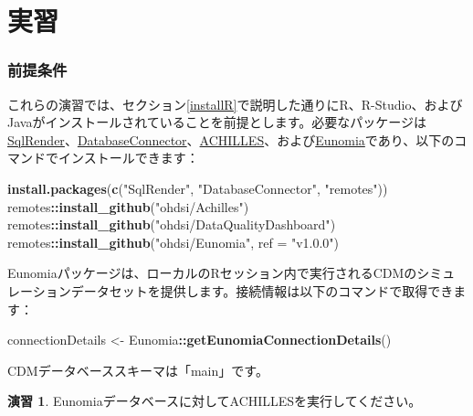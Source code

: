 \documentclass[
  11pt]{book}
\newenvironment{Shaded}{\begin{snugshade}}{\end{snugshade}}
\newcommand{\AttributeTok}[1]{\textcolor[rgb]{0.13,0.29,0.53}{#1}}
\newcommand{\FunctionTok}[1]{\textcolor[rgb]{0.13,0.29,0.53}{\textbf{#1}}}
\newcommand{\NormalTok}[1]{#1}
\newcommand{\OtherTok}[1]{\textcolor[rgb]{0.56,0.35,0.01}{#1}}
\newcommand{\SpecialCharTok}[1]{\textcolor[rgb]{0.81,0.36,0.00}{\textbf{#1}}}
\newcommand{\StringTok}[1]{\textcolor[rgb]{0.31,0.60,0.02}{#1}}
\theoremstyle{definition}
\theoremstyle{definition}
\theoremstyle{definition}
\newtheorem{exercise}{演習}[chapter]
\theoremstyle{definition}
\theoremstyle{remark}
\begin{document}
\section{実習}\label{ux5b9fux7fd2}

\subsubsection*{前提条件}\label{ux524dux63d0ux6761ux4ef6-9}

これらの演習では、セクション\ref{installR}で説明した通りにR、R-Studio、およびJavaがインストールされていることを前提とします。必要なパッケージは\href{https://ohdsi.github.io/SqlRender/}{SqlRender}、\href{https://ohdsi.github.io/DatabaseConnector/}{DatabaseConnector}、\href{https://github.com/OHDSI/Achilles}{ACHILLES}、および\href{https://ohdsi.github.io/Eunomia/}{Eunomia}であり、以下のコマンドでインストールできます：

\begin{Shaded}
\begin{Highlighting}[]
\FunctionTok{install.packages}\NormalTok{(}\FunctionTok{c}\NormalTok{(}\StringTok{"SqlRender"}\NormalTok{, }\StringTok{"DatabaseConnector"}\NormalTok{, }\StringTok{"remotes"}\NormalTok{))}
\NormalTok{remotes}\SpecialCharTok{::}\FunctionTok{install\_github}\NormalTok{(}\StringTok{"ohdsi/Achilles"}\NormalTok{)}
\NormalTok{remotes}\SpecialCharTok{::}\FunctionTok{install\_github}\NormalTok{(}\StringTok{"ohdsi/DataQualityDashboard"}\NormalTok{)}
\NormalTok{remotes}\SpecialCharTok{::}\FunctionTok{install\_github}\NormalTok{(}\StringTok{"ohdsi/Eunomia"}\NormalTok{, }\AttributeTok{ref =} \StringTok{"v1.0.0"}\NormalTok{)}
\end{Highlighting}
\end{Shaded}

Eunomiaパッケージは、ローカルのRセッション内で実行されるCDMのシミュレーションデータセットを提供します。接続情報は以下のコマンドで取得できます：

\begin{Shaded}
\begin{Highlighting}[]
\NormalTok{connectionDetails }\OtherTok{\textless{}{-}}\NormalTok{ Eunomia}\SpecialCharTok{::}\FunctionTok{getEunomiaConnectionDetails}\NormalTok{()}
\end{Highlighting}
\end{Shaded}

CDMデータベーススキーマは「main」です。

\begin{exercise}
\protect\hypertarget{exr:exerciseRunAchilles}{}\label{exr:exerciseRunAchilles}Eunomiaデータベースに対してACHILLESを実行してください。
\end{exercise}
\end{document}
